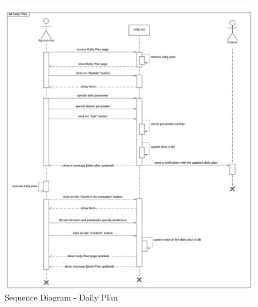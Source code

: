 \begin{center}
    \begin{figure}[H]
  \includegraphics[width=\textwidth,height=\textheight,keepaspectratio]{./Images/Sequence diagram Daily Plan.png}
  \caption{Sequence Diagram - Daily Plan}
\end{figure}
\end{center}

